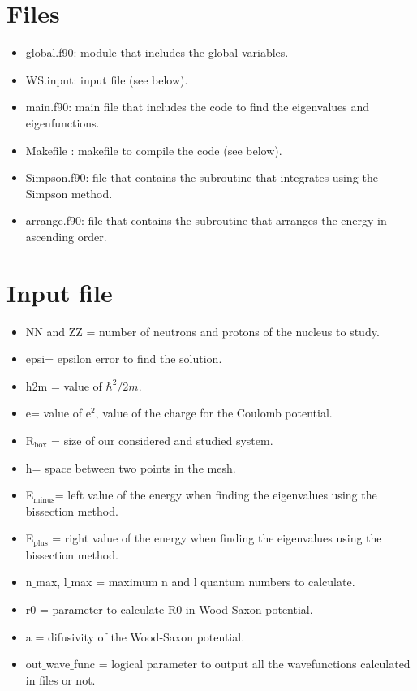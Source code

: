 \documentclass[a4paper,10pt]{article}
\begin{document}
\section{Files}
\begin{itemize}
 \item global.f90: module that includes the global variables. 
 \item WS.input: input file (see below).
 \item main.f90: main file that includes the code to find the eigenvalues and eigenfunctions. 
 \item Makefile : makefile to compile the code (see below). 
 \item Simpson.f90: file that contains the subroutine that integrates using the Simpson method.
 \item arrange.f90: file that contains the subroutine that arranges the energy in ascending order. 
\end{itemize}


\section{Input file}
\begin{itemize}
 \item NN and ZZ = number of neutrons and protons of the nucleus to study. 
 \item epsi= epsilon error to find the solution. 
 \item h2m = value of $\hbar^2/2m$.
 \item e= value of e$^2$, value of the charge for the Coulomb potential.
 \item R$_\mathrm{box}$ = size of our considered and studied system.
 \item h= space between two points in the mesh.
 \item E$_\mathrm{minus}$= left value of the energy when finding the eigenvalues using the bissection method.
 \item E$_\mathrm{plus}$ = right value of the energy when finding the eigenvalues using the bissection method.
 \item n$\_$max, l$\_$max = maximum n and l quantum numbers to calculate.
 \item r0 = parameter to calculate R0 in Wood-Saxon potential. 
 \item a = difusivity of the Wood-Saxon potential. 
 \item out$\_$wave$\_$func = logical parameter to output all the wavefunctions calculated in files or not.
\end{itemize}
\end{document}
